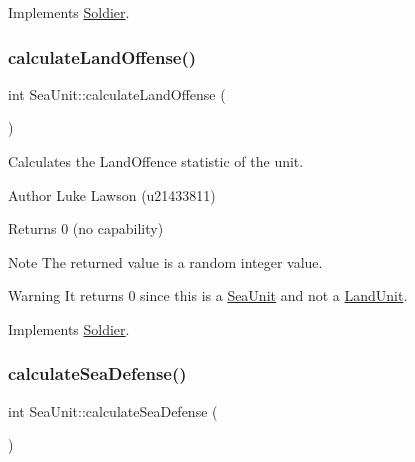 Implements \mbox{\hyperlink{class_soldier_ab37165b4ce8fbe4a24a759c81ece58c4}{Soldier}}.

\mbox{\label{class_sea_unit_a5b21e648106a6ec40c79a1916e9fe674}} 
\subsubsection{\texorpdfstring{calculateLandOffense()}{calculateLandOffense()}}
{\footnotesize\ttfamily int Sea\+Unit\+::calculate\+Land\+Offense (\begin{DoxyParamCaption}{ }\end{DoxyParamCaption})\hspace{0.3cm}{\ttfamily [virtual]}}



Calculates the Land\+Offence statistic of the unit. 

\begin{DoxyAuthor}{Author}
Luke Lawson (u21433811) 
\end{DoxyAuthor}
\begin{DoxyReturn}{Returns}
0 (no capability) 
\end{DoxyReturn}
\begin{DoxyNote}{Note}
The returned value is a random integer value. 
\end{DoxyNote}
\begin{DoxyWarning}{Warning}
It returns 0 since this is a \mbox{\hyperlink{class_sea_unit}{Sea\+Unit}} and not a \mbox{\hyperlink{class_land_unit}{Land\+Unit}}. 
\end{DoxyWarning}


Implements \mbox{\hyperlink{class_soldier_ac0add7efb3192adb809bc1746c880fc0}{Soldier}}.

\mbox{\label{class_sea_unit_a04480810f175b4c0c7d5b54e9397605f}} 
\subsubsection{\texorpdfstring{calculateSeaDefense()}{calculateSeaDefense()}}
{\footnotesize\ttfamily int Sea\+Unit\+::calculate\+Sea\+Defense (\begin{DoxyParamCaption}{ }\end{DoxyParamCaption})\hspace{0.3cm}{\ttfamily [virtual]}}



